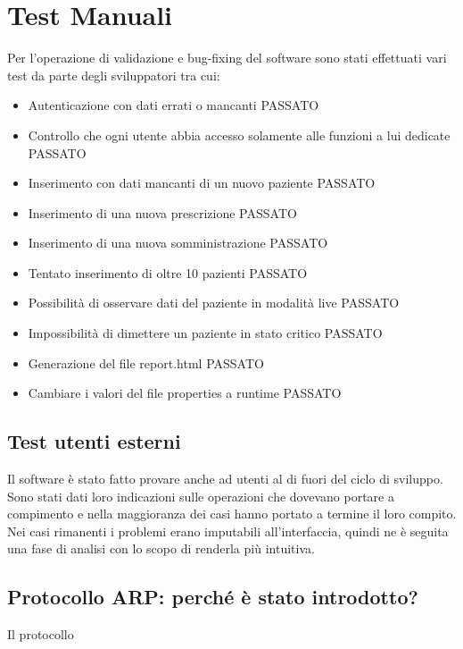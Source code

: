 \documentclass[a4paper]{report}
\begin{document}
    \section*{Test Manuali}
        Per l'operazione di validazione e bug-fixing del software sono stati effettuati vari test da parte degli sviluppatori tra cui:
        \begin{itemize}
            \item Autenticazione con dati errati o mancanti PASSATO
            \item Controllo che ogni utente abbia accesso solamente alle funzioni a lui dedicate PASSATO
            \item Inserimento con dati mancanti di un nuovo paziente PASSATO
            \item Inserimento di una nuova prescrizione PASSATO
            \item Inserimento di una nuova somministrazione PASSATO
            \item Tentato inserimento di oltre 10 pazienti PASSATO
            \item Possibilit\`a di osservare dati del paziente in modalit\`a live PASSATO
            \item Impossibilit\`a di dimettere un paziente in stato critico PASSATO
            \item Generazione del file report.html PASSATO
            \item Cambiare i valori del file properties a runtime PASSATO
        \end{itemize}
        
    \subsection*{Test utenti esterni}
    Il software \`e stato fatto provare anche ad utenti al di fuori del ciclo di sviluppo. Sono stati dati loro indicazioni sulle operazioni che dovevano portare a compimento e nella maggioranza dei casi hanno portato a termine il loro compito. Nei casi rimanenti i problemi erano imputabili all'interfaccia, quindi ne \`e seguita una fase di analisi con lo scopo di renderla pi\`u intuitiva.

    \subsection*{Protocollo ARP: perché è stato introdotto?}
    Il protocollo
    
\end{document}
